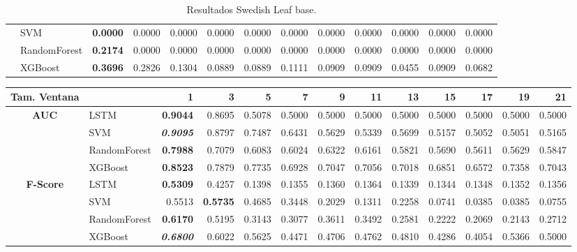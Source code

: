 \begin{table}[H]
\begin{adjustbox}{max width=12cm}
\begin{tabular}{|c|l|r|r|r|r|r|r|r|r|r|r|r|}
		&  SVM & \textbf{  0.0000 } &  0.0000 &  0.0000 &  0.0000 &  0.0000 &  0.0000 &  0.0000 &  0.0000 &  0.0000 &  0.0000 &  0.0000 \\
		&  RandomForest & \textbf{  0.2174 } &  0.0000 &  0.0000 &  0.0000 &  0.0000 &  0.0000 &  0.0000 &  0.0000 &  0.0000 &  0.0000 &  0.0000 \\
		&  XGBoost & \textbf{  0.3696 } &  0.2826 &  0.1304 &  0.0889 &  0.0889 &  0.1111 &  0.0909 &  0.0909 &  0.0455 &  0.0909 &  0.0682 \\
		\hline
	\end{tabular}
\end{adjustbox}
\caption{Resultados Swedish Leaf base.}
\label{tab:SLeaf_base}
\end{table}

\begin{table}[H]
\centering
\begin{adjustbox}{max width=12cm}
	\begin{tabular}{|c|l|r|r|r|r|r|r|r|r|r|r|r|}
		\hline
		\textbf{Tam. Ventana} &         &      1  &      3  &      5  &      7  &      9  &      11 &      13 &      15 &      17 &      19 &      21 \\
		\hline
		\textbf{AUC} &  LSTM & \textbf{  0.9044 } &  0.8695 &  0.5078 &  0.5000 &  0.5000 &  0.5000 &  0.5000 &  0.5000 &  0.5000 &  0.5000 &  0.5000 \\
		&  SVM & \textit{ \textbf{  0.9095 } } &  0.8797 &  0.7487 &  0.6431 &  0.5629 &  0.5339 &  0.5699 &  0.5157 &  0.5052 &  0.5051 &  0.5165 \\
		&  RandomForest & \textbf{  0.7988 } &  0.7079 &  0.6083 &  0.6024 &  0.6322 &  0.6161 &  0.5821 &  0.5690 &  0.5611 &  0.5629 &  0.5847 \\
		&  XGBoost & \textbf{  0.8523 } &  0.7879 &  0.7735 &  0.6928 &  0.7047 &  0.7056 &  0.7018 &  0.6851 &  0.6572 &  0.7358 &  0.7043 \\
		\hline
		\textbf{F-Score} &  LSTM & \textbf{  0.5309 } &  0.4257 &  0.1398 &  0.1355 &  0.1360 &  0.1364 &  0.1339 &  0.1344 &  0.1348 &  0.1352 &  0.1356 \\
		&  SVM &  0.5513 & \textbf{  0.5735 } &  0.4685 &  0.3448 &  0.2029 &  0.1311 &  0.2258 &  0.0741 &  0.0385 &  0.0385 &  0.0755 \\
		&  RandomForest & \textbf{  0.6170 } &  0.5195 &  0.3143 &  0.3077 &  0.3611 &  0.3492 &  0.2581 &  0.2222 &  0.2069 &  0.2143 &  0.2712 \\
		&  XGBoost & \textit{ \textbf{  0.6800 } } &  0.6022 &  0.5625 &  0.4471 &  0.4706 &  0.4762 &  0.4810 &  0.4286 &  0.4054 &  0.5366 &  0.5000 \\

\end{tabular}
\end{adjustbox}
\end{table}
